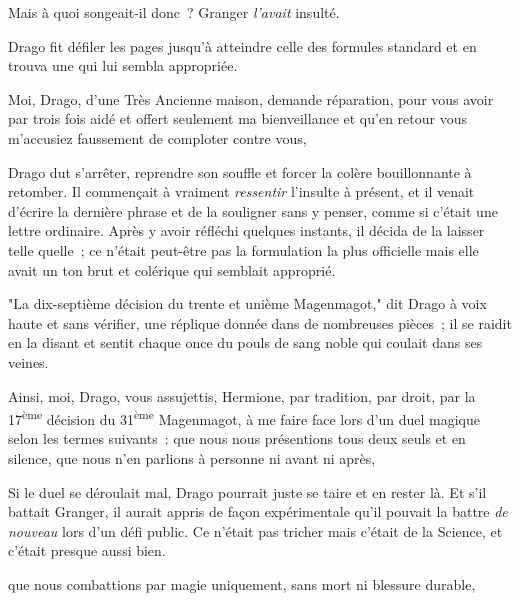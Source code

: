 Mais à quoi songeait-il donc~? Granger \emph{l'avait} insulté.

Drago fit défiler les pages jusqu'à atteindre celle des formules standard et en trouva une qui lui sembla appropriée.

\begin{writtenNote}
Moi, Drago, d'une Très Ancienne maison, demande réparation, pour vous avoir par trois fois aidé et offert seulement ma bienveillance et qu'en retour vous m'accusiez {faussement} de comploter contre vous, \end{writtenNote}

Drago dut s'arrêter, reprendre son souffle et forcer la colère bouillonnante à retomber. Il commençait à vraiment \emph{ressentir} l'insulte à présent, et il venait d'écrire la dernière phrase et de la souligner sans y penser, comme si c'était une lettre ordinaire. Après y avoir réfléchi quelques instants, il décida de la laisser telle quelle~; ce n'était peut-être pas la formulation la plus officielle mais elle avait un ton brut et colérique qui semblait approprié.

\begin{writtenNote}
Insulte que vous avez commise face aux yeux d'Angleterre.

{Ainsi, moi, Drago, vous assujettis, Hermione, par tradition, par droit, par
\end{writtenNote}

"La dix-septième décision du trente et unième Magenmagot," dit Drago à voix haute et sans vérifier, une réplique donnée dans de nombreuses pièces~; il se raidit en la disant et sentit chaque once du pouls de sang noble qui coulait dans ses veines.

\begin{writtenNote}
Ainsi, moi, Drago, vous assujettis, Hermione, par tradition, par droit, par la 17\textsuperscript{ème} décision du 31\textsuperscript{ème} Magenmagot, à me faire face lors d'un duel magique selon les termes suivants~: que nous nous présentions tous deux seuls et en silence, que nous n'en parlions à personne ni avant ni après,\end{writtenNote}

Si le duel se déroulait mal, Drago pourrait juste se taire et en rester là. Et s'il battait Granger, il aurait appris de façon expérimentale qu'il pouvait la battre \emph{de nouveau} lors d'un défi public. Ce n'était pas tricher mais c'était de la Science, et c'était presque aussi bien.

\begin{writtenNote}
que nous combattions par magie uniquement, sans mort ni blessure durable,
\end{writtenNote}

